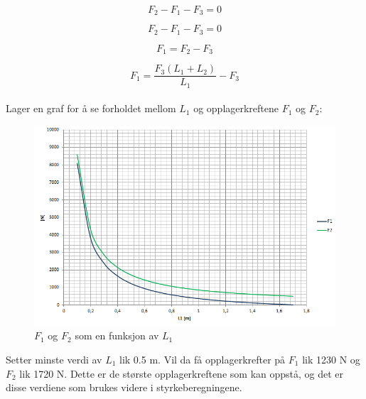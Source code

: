 \begin{equation}
F_2-F_1-F_3=0
\end{equation}

\begin{equation}
F_2-F_1-F_3=0
\end{equation}
 
\begin{equation}
F_1=F_2-F_3
\end{equation}


\begin{equation}
F_1=\frac{F_3(L_1+L_2)}{L_1}-F_3
\end{equation} \\

Lager en graf for å se forholdet mellom $L_1$ og opplagerkreftene $F_1$ og $F_2$:

\begin{figure}[htb]
\begin{center}
\leavevmode
\includegraphics[width=1.0\textwidth]{images/Bilden_2}
\end{center}
\caption{$F_1$ og $F_2$ som en funksjon av $L_1$}
\label{fig:Krefter}
\end{figure}

Setter minste verdi av $L_1$ lik 0.5 m. Vil da få opplagerkrefter på $F_1$ lik 1230 N og $F_2$ lik 1720 N. Dette er de største opplagerkreftene som kan oppstå, og det er disse verdiene som brukes videre i styrkeberegningene.



